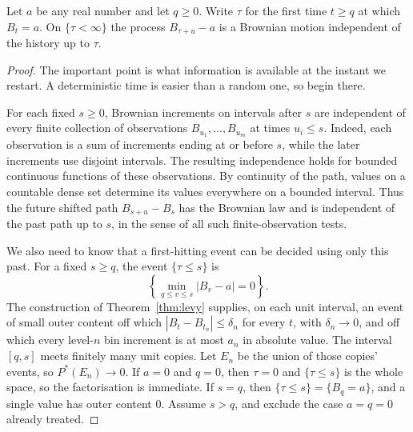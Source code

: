 \begin{proposition}\label{prop:restart}
Let $a$ be any real number and let $q\ge0$. Write $\tau$ for the first time $t\ge q$ at which $B_t=a$. On $\{\tau<\infty\}$ the process $B_{\tau+u}-a$ is a Brownian motion independent of the history up to $\tau$.
\end{proposition}
\begin{proof}
The important point is what information is available at the instant we restart. A deterministic time is easier than a random one, so begin there.

For each fixed $s\ge0$, Brownian increments on intervals after $s$ are independent of every finite collection of observations $B_{u_1},\ldots,B_{u_m}$ at times $u_i\le s$. Indeed, each observation is a sum of increments ending at or before $s$, while the later increments use disjoint intervals. The resulting independence holds for bounded continuous functions of these observations. By continuity of the path, values on a countable dense set determine its values everywhere on a bounded interval. Thus the future shifted path $B_{s+u}-B_s$ has the Brownian law and is independent of the past path up to $s$, in the sense of all such finite-observation tests.

We also need to know that a first-hitting event can be decided using only this past. For a fixed $s\ge q$, the event $\{\tau\le s\}$ is
\[
 \left\{\min_{q\le v\le s}|B_v-a|=0\right\}.
\]
The construction of Theorem~\ref{thm:levy} supplies, on each unit interval, an event of small outer content off which $|B_t-B_{t_n}|\le\delta_n$ for every $t$, with $\delta_n\to0$, and off which every level-$n$ bin increment is at most $a_n$ in absolute value. The interval $[q,s]$ meets finitely many unit copies. Let $E_n$ be the union of those copies' events, so $P^*(E_n)\to0$. If $a=0$ and $q=0$, then $\tau=0$ and $\{\tau\le s\}$ is the whole space, so the factorisation is immediate. If $s=q$, then $\{\tau\le s\}=\{B_q=a\}$, and a single value has outer content $0$. Assume $s>q$, and exclude the case $a=q=0$ already treated.


\end{proof}
